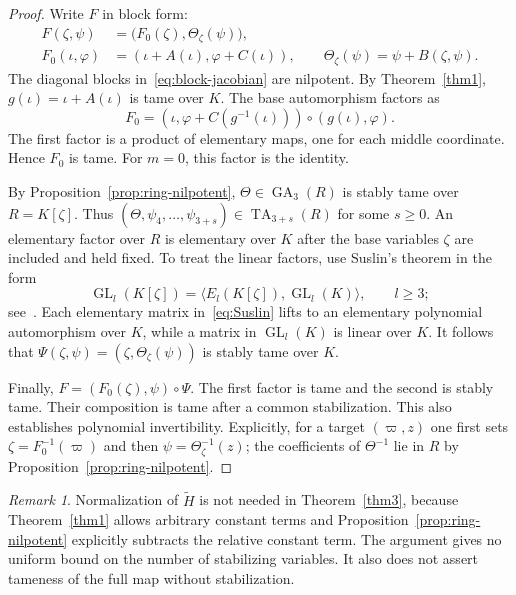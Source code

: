 \documentclass[11pt,reqno]{amsart}
\theoremstyle{definition}
\theoremstyle{remark}
\newtheorem{remark}[theorem]{Remark}
\numberwithin{equation}{section}
\DeclareMathOperator{\GL}{GL}
\DeclareMathOperator{\GA}{GA}
\DeclareMathOperator{\TA}{TA}
\begin{document}
\begin{proof}
Write $F$ in block form:
\begin{equation}\label{eq:block-F}
 \begin{aligned}
 F(\zeta,\psi)&=\bigl(F_0(\zeta),\Theta_{\zeta}(\psi)\bigr),\\
 F_0(\iota,\varphi)&=(\iota+A(\iota),\varphi+C(\iota)),\qquad \Theta_{\zeta}(\psi)=\psi+B(\zeta,\psi).
 \end{aligned}
\end{equation}
The diagonal blocks in~\eqref{eq:block-jacobian} are nilpotent. By Theorem~\ref{thm1}, $g(\iota)=\iota+A(\iota)$ is tame over $K$. The base automorphism factors as
\[
 F_0=(\iota,\varphi+C(g^{-1}(\iota)))\circ(g(\iota),\varphi).
\]
The first factor is a product of elementary maps, one for each middle coordinate. Hence $F_0$ is tame. For $m=0$, this factor is the identity.

By Proposition~\ref{prop:ring-nilpotent}, $\Theta\in\GA_3(R)$ is stably tame over $R=K[\zeta]$. Thus $(\Theta,\psi_4,\ldots,\psi_{3+s})\in\TA_{3+s}(R)$ for some $s\geq0$. An elementary factor over $R$ is elementary over $K$ after the base variables $\zeta$ are included and held fixed. To treat the linear factors, use Suslin's theorem in the form
\begin{equation}\label{eq:Suslin}
 \GL_l(K[\zeta])=\langle E_l(K[\zeta]),\GL_l(K)\rangle,
 \qquad l\geq3;
\end{equation}
see~\cite[Theorem~3.23]{BEW}. Each elementary matrix in~\eqref{eq:Suslin} lifts to an elementary polynomial automorphism over $K$, while a matrix in $\GL_l(K)$ is linear over $K$. It follows that $\Psi(\zeta,\psi)=(\zeta,\Theta_{\zeta}(\psi))$ is stably tame over $K$.

Finally, $F=(F_0(\zeta),\psi)\circ\Psi$. The first factor is tame and the second is stably tame. Their composition is tame after a common stabilization. This also establishes polynomial invertibility. Explicitly, for a target $(\varpi,z)$ one first sets $\zeta=F_0^{-1}(\varpi)$ and then $\psi=\Theta_{\zeta}^{-1}(z)$; the coefficients of $\Theta^{-1}$ lie in $R$ by Proposition~\ref{prop:ring-nilpotent}.
\end{proof}

\begin{remark}\label{rem:block-scope}
Normalization of $\widetilde H$ is not needed in Theorem~\ref{thm3}, because Theorem~\ref{thm1} allows arbitrary constant terms and Proposition~\ref{prop:ring-nilpotent} explicitly subtracts the relative constant term. The argument gives no uniform bound on the number of stabilizing variables. It also does not assert tameness of the full map without stabilization.
\end{remark}
\end{document}
